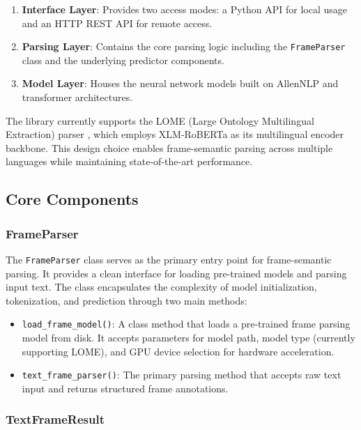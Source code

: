 \begin{enumerate}
    \item \textbf{Interface Layer}: Provides two access modes: a Python API for local usage and an HTTP REST API for remote access.
    \item \textbf{Parsing Layer}: Contains the core parsing logic including the \texttt{FrameParser} class and the underlying predictor components.
    \item \textbf{Model Layer}: Houses the neural network models built on AllenNLP and transformer architectures.
\end{enumerate}

The library currently supports the LOME (Large Ontology Multilingual Extraction) parser \cite{Xia2021}, which employs XLM-RoBERTa \cite{Conneau2020} as its multilingual encoder backbone. This design choice enables frame-semantic parsing across multiple languages while maintaining state-of-the-art performance.

\subsection{Core Components}

\subsubsection{FrameParser}

The \texttt{FrameParser} class serves as the primary entry point for frame-semantic parsing. It provides a clean interface for loading pre-trained models and parsing input text. The class encapsulates the complexity of model initialization, tokenization, and prediction through two main methods:

\begin{itemize}
    \item \texttt{load\_frame\_model()}: A class method that loads a pre-trained frame parsing model from disk. It accepts parameters for model path, model type (currently supporting LOME), and GPU device selection for hardware acceleration.
    \item \texttt{text\_frame\_parser()}: The primary parsing method that accepts raw text input and returns structured frame annotations.
\end{itemize}

\subsubsection{TextFrameResult}

